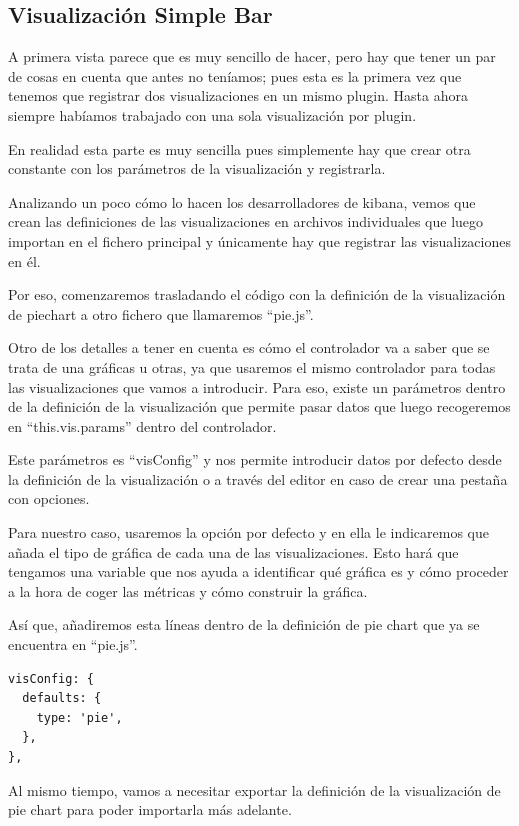 \documentclass[a4paper, 12pt]{book}
\begin{document}
\subsection{Visualización Simple Bar}
A primera vista parece que es muy sencillo de hacer, pero hay que tener un par de cosas en cuenta que antes no teníamos; pues esta es la primera vez que tenemos que registrar dos visualizaciones en un mismo plugin. Hasta ahora siempre habíamos trabajado con una sola visualización por plugin. 

En realidad esta parte es muy sencilla pues simplemente hay que crear otra constante con los parámetros de la visualización y registrarla. 

Analizando un poco cómo lo hacen los desarrolladores de kibana, vemos que crean las definiciones de las visualizaciones en archivos individuales que luego importan en el fichero principal y únicamente hay que registrar las visualizaciones en él. 

Por eso, comenzaremos trasladando el código con la definición de la visualización de piechart a otro fichero que llamaremos “pie.js”. 

Otro de los detalles a tener en cuenta es cómo el controlador va a saber que se trata de una gráficas u otras, ya que usaremos el mismo controlador para todas las visualizaciones que vamos a introducir. Para eso, existe un parámetros dentro de la definición de la visualización que permite pasar datos que luego recogeremos en “this.vis.params” dentro del controlador.

Este parámetros es “visConfig” y nos permite introducir datos por defecto desde la definición de la visualización o a través del editor en caso de crear una pestaña con opciones. 

Para nuestro caso, usaremos la opción por defecto y en ella le indicaremos que añada el tipo de gráfica de cada una de las visualizaciones. Esto hará que tengamos una variable que nos ayuda a identificar qué gráfica es y cómo proceder a la hora de coger las métricas y cómo construir la gráfica.

Así que, añadiremos esta líneas dentro de la definición de pie chart que ya se encuentra en “pie.js”.

\begin{lstlisting}[frame=single]
visConfig: {
  defaults: {
    type: 'pie',
  },
},
\end{lstlisting}

Al mismo tiempo, vamos a necesitar exportar la definición de la visualización de pie chart para poder importarla más adelante.
\end{document}

